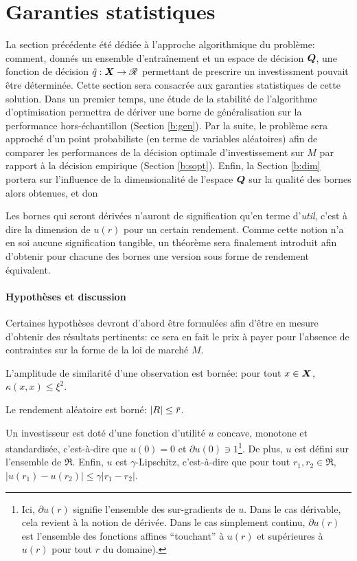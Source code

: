 \section{Garanties statistiques}
\label{sec:bound}

La section précédente été dédiée à l'approche algorithmique du problème: comment, donnés
un ensemble d'entraînement et un espace de décision $\bm Q$, une fonction de décision
$\hat q:\bm{X} \to \mathscr{R}$ permettant de prescrire un investissment pouvait être déterminée. Cette
section sera consacrée aux garanties statistiques de cette solution. Dans un premier
temps, une étude de la stabilité de l'algorithme d'optimisation permettra de dériver une
borne de généralisation sur la performance hors-échantillon (Section \ref{b:gen}). Par la
suite, le problème sera approché d'un point probabiliste (en terme de variables
aléatoires) afin de comparer les performances de la décision optimale d'investissement sur
$M$ par rapport à la décision empirique (Section \ref{b:sopt}). Enfin, la Section
\ref{b:dim} portera sur l'influence de la dimensionalité de l'espace $\bm Q$ sur la qualité
des bornes alors obtenues, et don

Les bornes qui seront dérivées n'auront de signification qu'en terme d'\textit{util},
c'est à dire la dimension de $u(r)$ pour un certain rendement. Comme cette notion n'a en
soi aucune signification tangible, un théorème sera finalement introduit afin d'obtenir
pour chacune des bornes une version sous forme de rendement équivalent.


\paragraph{Hypothèses et discussion}

Certaines hypothèses devront d'abord être formulées afin d'être en mesure d'obtenir des
résultats pertinents: ce sera en fait le prix à payer pour l'absence de contraintes sur la
forme de la loi de marché $M$.

\begin{assumption}
  L'amplitude de similarité d'une observation est bornée: pour tout $x \in \bm{X}$,
  $\kappa(x,x) \leq \xi^2$.
\end{assumption}
\begin{assumption}
  Le rendement aléatoire est borné: $|R| \leq \bar r$.
\end{assumption}
\begin{assumption}
  \label{hyp:lip}
  Un investisseur est doté d'une fonction d'utilité $u$ concave, monotone et standardisée,
  c'est-à-dire que $u(0) = 0$ et $\partial u(0) \ni 1$\footnote{Ici, $\partial u(r)$ signifie l'ensemble
    des sur-gradients de $u$. Dans le cas dérivable, cela revient à la notion de
    dérivée. Dans le cas simplement continu, $\partial u(r)$ est l'ensemble des fonctions affines
    ``touchant'' à $u(r)$ et supérieures à $u(r)$ pour tout $r$ du domaine).}. De plus,
  $u$ est défini sur l'ensemble de $\Re$. Enfin, $u$ est $\gamma$-Lipschitz, c'est-à-dire que
  pour tout $r_1,r_2 \in \Re$, $|u(r_1) - u(r_2)| \leq \gamma|r_1-r_2|$.
\end{assumption}

